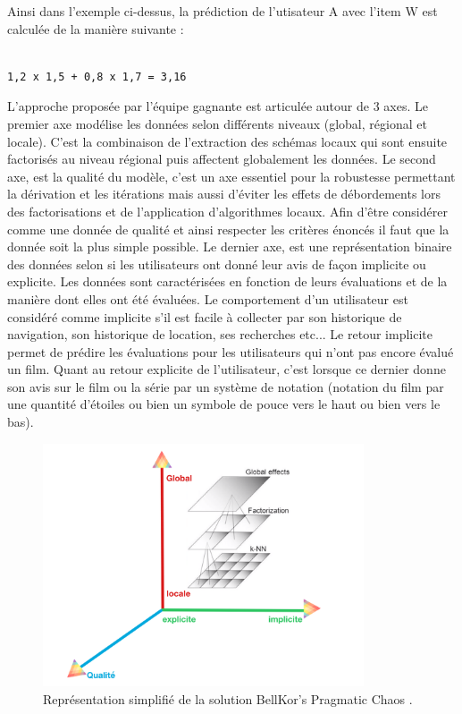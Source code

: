 \vspace{5mm}

Ainsi dans l'exemple ci-dessus, la prédiction de l'utisateur A avec l'item W est calculée de la manière suivante : 
\begin{verbatim}

1,2 x 1,5 + 0,8 x 1,7 = 3,16 

\end{verbatim}


L'approche proposée par l’équipe gagnante est articulée autour de 3 axes. Le premier axe modélise les données selon différents niveaux (global, régional et locale). C’est la combinaison de l’extraction des schémas locaux qui sont ensuite factorisés au niveau régional puis affectent globalement les données. Le second axe, est la qualité du modèle, c’est un axe essentiel pour la robustesse permettant la dérivation et les itérations mais aussi d'éviter les effets de débordements lors des factorisations et de l'application d’algorithmes locaux. Afin d’être considérer comme une donnée de qualité et ainsi respecter les critères énoncés il faut que la donnée soit la plus simple possible. Le dernier axe, est une représentation binaire des données selon si les utilisateurs ont donné leur avis de façon implicite ou explicite. Les données sont caractérisées en fonction de leurs évaluations et de la manière dont elles ont été évaluées. Le comportement d’un utilisateur est considéré comme implicite s’il est facile à collecter par son historique de navigation, son historique de location, ses recherches etc... Le retour implicite permet de prédire les évaluations pour les utilisateurs qui n’ont pas encore évalué un film. Quant au retour explicite de l'utilisateur, c'est lorsque ce dernier donne son avis sur le film ou la série par un système de notation (notation du film par une quantité d'étoiles ou bien un symbole de pouce vers le haut ou bien vers le bas). 

\vspace{5mm}

\begin{figure}[htp]
  \centering
  \includegraphics[width=95mm]{./src_img/BPC}
  \caption{Représentation simplifié de la solution BellKor’s Pragmatic Chaos .}
  \label{fig:trois-quatre}
\end{figure}

